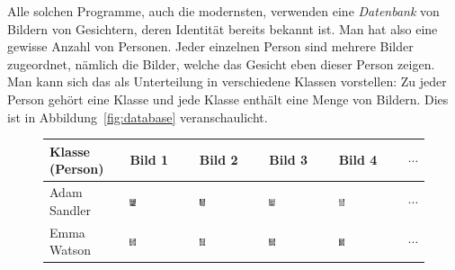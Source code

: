 Alle solchen Programme, auch die modernsten, verwenden eine \textit{Datenbank} von Bildern von Gesichtern, deren Identität bereits bekannt ist.
Man hat also eine gewisse Anzahl von Personen.
Jeder einzelnen Person sind mehrere Bilder zugeordnet, nämlich die Bilder, welche das Gesicht eben dieser Person zeigen.
Man kann sich das als Unterteilung in verschiedene Klassen vorstellen: Zu jeder Person gehört eine Klasse und jede Klasse enthält eine Menge von Bildern.
Dies ist in Abbildung~\ref{fig:database} veranschaulicht.
\begin{figure}[ht]
	\centering
	\begin{tabular}{l m{2cm} m{2cm} m{2cm} m{2cm} c}
		\textbf{Klasse (Person)} & \textbf{Bild 1} & \textbf{Bild 2} & \textbf{Bild 3} & \textbf{Bild 4} & $\cdots$ \\ \hline
		Adam Sandler & \includegraphics[width=0.1\textwidth]{images/intro/class0_0} &
		\includegraphics[width=0.1\textwidth]{images/intro/class0_1} & \includegraphics[width=0.1\textwidth]{images/intro/class0_2} & \includegraphics[width=0.1\textwidth]{images/intro/class0_3} & $\cdots$ \\ \hline
		Emma Watson & \includegraphics[width=0.1\textwidth]{images/intro/class1_0} &
		\includegraphics[width=0.1\textwidth]{images/intro/class1_1} & \includegraphics[width=0.1\textwidth]{images/intro/class1_2} & \includegraphics[width=0.1\textwidth]{images/intro/class1_3} & $\cdots$ \\ \hline

\end{tabular}
\end{figure}
